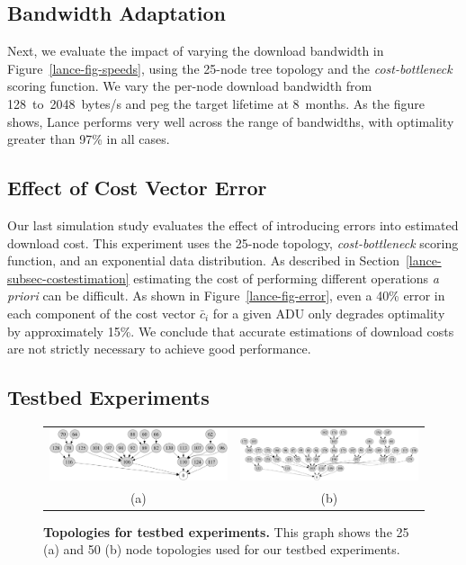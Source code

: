 \subsection{Bandwidth Adaptation}
\label{lance-sec-eval-params}

Next, we evaluate the impact of varying the download bandwidth in
Figure~\ref{lance-fig-speeds}, using the 25-node tree topology and the
\textit{cost-bottleneck} scoring function. We vary the per-node download
bandwidth from 128~to~2048~bytes/s and peg the target lifetime at 8~months.
As the figure shows, Lance performs very well across the range of bandwidths,
with optimality greater than 97\% in all cases.

\subsection{Effect of Cost Vector Error}

Our last simulation study evaluates the effect of introducing errors into
estimated download cost. This experiment uses the 25-node topology,
\textit{cost-bottleneck} scoring function, and an exponential data
distribution. As described in Section~\ref{lance-subsec-costestimation}
estimating the cost of performing different operations \textit{a priori} can
be difficult. As shown in Figure~\ref{lance-fig-error}, even a 40\% error in
each component of the cost vector $\bar{c}_i$ for a given ADU only degrades
optimality by approximately 15\%. We conclude that accurate estimations of
download costs are not strictly necessary to achieve good performance.

\subsection{Testbed Experiments}
\label{lance-sec-eval-policies}

\begin{figure}[t]
\begin{center}
\begin{tabular}{cc}
\includegraphics[width=0.45\hsize]{./4-lance/figs/topology25.pdf} &
\includegraphics[width=0.45\hsize]{./4-lance/figs/topology50.pdf} \\
(a) &
(b)\\
\end{tabular}
\end{center}

\caption{\textbf{Topologies for testbed experiments.} This graph shows the 25
(a) and 50 (b) node topologies used for our testbed experiments.}

\label{lance-fig-topology}
\end{figure}

